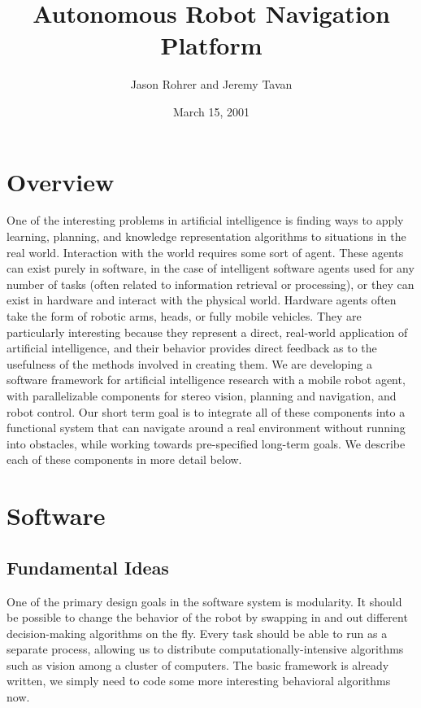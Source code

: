 \documentclass[12pt]{article}
\begin{document}
\title{Autonomous Robot Navigation Platform}


\author{Jason Rohrer and Jeremy Tavan}
\date{March 15, 2001}
\maketitle

\section{Overview}

One of the interesting problems in artificial intelligence is
finding ways to apply learning, planning, and knowledge representation algorithms
to situations in the real world. Interaction with the world requires some sort
of agent. These agents can exist purely in software, in the case of intelligent software
agents used for any number of tasks (often related to information retrieval
or processing), or they can exist in hardware and interact with the physical world.
Hardware agents often take the form of robotic arms, heads, or fully mobile
vehicles. They are particularly interesting because they represent a direct,
real-world application of artificial intelligence, and their behavior provides
direct feedback as to the usefulness of the methods involved in creating them.
We are developing a software framework for artificial intelligence research
with a mobile robot agent, with parallelizable components for stereo vision,
planning and navigation, and robot control. Our short term goal is to integrate
all of these components into a functional system that can navigate around a real environment without running into obstacles, while
working towards pre-specified long-term goals.  We describe each of these components in more detail below.


\section{Software}


\subsection{Fundamental Ideas}

One of the primary design goals in the software system is modularity. It should
be possible to change the behavior of the robot by swapping in and out different
decision-making algorithms on the fly. Every task should be able to run as a separate process, allowing us to distribute computationally-intensive algorithms such as vision among
a cluster of computers. The basic framework is already written, we simply need
to code some more interesting behavioral algorithms now.
\end{document}
